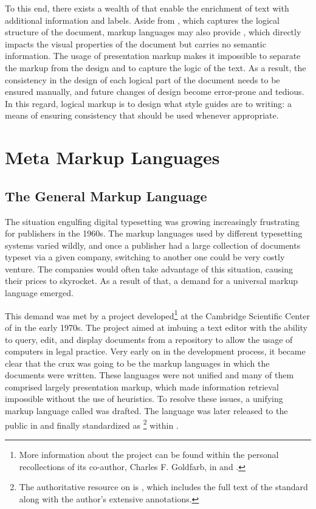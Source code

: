 \documentclass{book}
\begin{document}
To this end, there exists a wealth of  that enable the
enrichment of text with additional information and labels. Aside from
, which captures the logical structure of the document, markup
languages may also provide , which directly impacts
the visual properties of the document but carries no semantic information. The
usage of presentation markup makes it impossible to separate the markup from the
design and to capture the logic of the text. As a result, the consistency in the
design of each logical part of the document needs to be ensured manually, and
future changes of design become error-prone and tedious. In this regard, logical
markup is to design what style guides are to writing: a means of ensuring
consistency that should be used whenever appropriate.

\section{Meta Markup Languages}
\subsection{The General Markup Language}
The situation engulfing digital typesetting was growing increasingly frustrating
for publishers in the 1960s. The markup languages used by different typesetting
systems varied wildly, and once a publisher had a large collection of documents
typeset via a given company, switching to another one could be very costly
venture. The companies would often take advantage of this situation, causing
their prices to skyrocket. As a result of that, a demand for a universal markup
language emerged.

This demand was met by a project developed\footnote{
  More information about the project can be found within the personal
  recollections of its co-author, Charles F. Goldfarb, in \cite{goldfarb96} and
  \cite{goldfarb97:whySGML}.
} at the Cambridge Scientific Center of  in the early 1970s. The
project aimed at imbuing a text editor with the ability to query, edit, and
display documents from a repository to allow the usage of computers in legal
practice. Very early on in the development process, it became clear that the
crux was going to be the markup languages in which the documents were written.
These languages were not unified and many of them comprised largely presentation
markup, which made information retrieval impossible without the use of
heuristics. To resolve these issues, a unifying markup language called
 was drafted. The language was later released to the public in
\cite{goldfarb81} and finally standardized as \footnote{
  The authoritative resource on  is \cite{goldfarb91}, which
  includes the full text of the standard along with the author's extensive
  annotations.
} within \cite{iso8879}.
\end{document}
